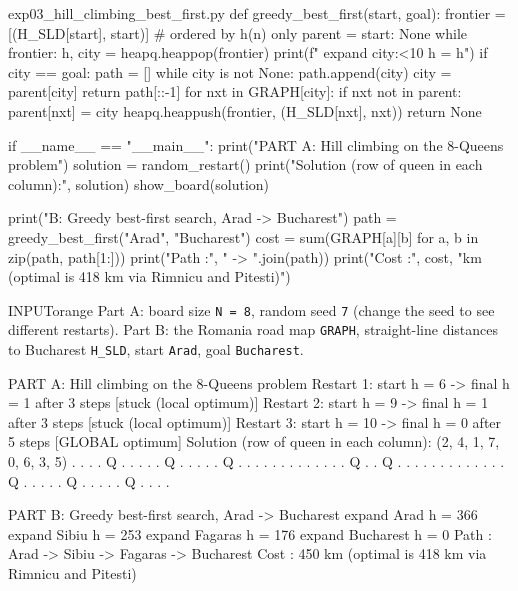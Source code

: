\documentclass[11pt,a4paper]{article}
\newenvironment{inputbox}{\begin{secbox}{INPUT}{orange}}{\end{secbox}}
\begin{document}
\begin{pycode}{exp03\_hill\_climbing\_best\_first.py}
def greedy_best_first(start, goal):
    frontier = [(H_SLD[start], start)]           # ordered by h(n) only
    parent = {start: None}
    while frontier:
        h, city = heapq.heappop(frontier)
        print(f"   expand {city:<10} h = {h}")
        if city == goal:
            path = []
            while city is not None:
                path.append(city)
                city = parent[city]
            return path[::-1]
        for nxt in GRAPH[city]:
            if nxt not in parent:
                parent[nxt] = city
                heapq.heappush(frontier, (H_SLD[nxt], nxt))
    return None


if __name__ == "__main__":
    print("PART A: Hill climbing on the 8-Queens problem")
    solution = random_restart()
    print("Solution (row of queen in each column):", solution)
    show_board(solution)

    print("\nPART B: Greedy best-first search, Arad -> Bucharest")
    path = greedy_best_first("Arad", "Bucharest")
    cost = sum(GRAPH[a][b] for a, b in zip(path, path[1:]))
    print("Path :", " -> ".join(path))
    print("Cost :", cost, "km  (optimal is 418 km via Rimnicu and Pitesti)")
\end{pycode}

\begin{inputbox}
Part A: board size \texttt{N = 8}, random seed \texttt{7} (change the seed to see different restarts). Part B: the Romania road map \texttt{GRAPH}, straight-line distances to Bucharest \texttt{H\_SLD}, start \texttt{Arad}, goal \texttt{Bucharest}.
\end{inputbox}

\begin{outputbox}
PART A: Hill climbing on the 8-Queens problem
Restart 1: start h =  6 -> final h = 1 after 3 steps  [stuck (local optimum)]
Restart 2: start h =  9 -> final h = 1 after 3 steps  [stuck (local optimum)]
Restart 3: start h = 10 -> final h = 0 after 5 steps  [GLOBAL optimum]
Solution (row of queen in each column): (2, 4, 1, 7, 0, 6, 3, 5)
   . . . . Q . . .
   . . Q . . . . .
   Q . . . . . . .
   . . . . . . Q .
   . Q . . . . . .
   . . . . . . . Q
   . . . . . Q . .
   . . . Q . . . .

PART B: Greedy best-first search, Arad -> Bucharest
   expand Arad       h = 366
   expand Sibiu      h = 253
   expand Fagaras    h = 176
   expand Bucharest  h = 0
Path : Arad -> Sibiu -> Fagaras -> Bucharest
Cost : 450 km  (optimal is 418 km via Rimnicu and Pitesti)
\end{outputbox}
\end{document}

